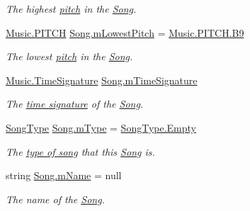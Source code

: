 \begin{DoxyCompactItemize}
\begin{DoxyCompactList}\small\item\em The highest \hyperlink{group___music_enums_ga508f69b199ea518f935486c990edac1d}{pitch} in the \hyperlink{class_song}{Song}. \end{DoxyCompactList}\item 
\hyperlink{group___music_enums_ga508f69b199ea518f935486c990edac1d}{Music.\+P\+I\+T\+CH} \hyperlink{group___song_priv_var_ga293976ef4c2050687a81edfbf77b4fc1}{Song.\+m\+Lowest\+Pitch} = \hyperlink{group___music_enums_gga508f69b199ea518f935486c990edac1da18fc90be5b8124af983421d29bfc4352}{Music.\+P\+I\+T\+C\+H.\+B9}
\begin{DoxyCompactList}\small\item\em The lowest \hyperlink{group___music_enums_ga508f69b199ea518f935486c990edac1d}{pitch} in the \hyperlink{class_song}{Song}. \end{DoxyCompactList}\item 
\hyperlink{group___music_structs_struct_music_1_1_time_signature}{Music.\+Time\+Signature} \hyperlink{group___song_priv_var_ga2b2dcc0e83e49f7303b6a1371877b25e}{Song.\+m\+Time\+Signature}
\begin{DoxyCompactList}\small\item\em The \hyperlink{group___music_structs_struct_music_1_1_time_signature}{time signature} of the \hyperlink{class_song}{Song}. \end{DoxyCompactList}\item 
\hyperlink{group___song_enums_gae681a1f001333e39fc1cb4fea97bfe1b}{Song\+Type} \hyperlink{group___song_priv_var_gaf3b9d0f461522324f897b746311b43c5}{Song.\+m\+Type} = \hyperlink{group___song_enums_ggae681a1f001333e39fc1cb4fea97bfe1bace2c8aed9c2fa0cfbed56cbda4d8bf07}{Song\+Type.\+Empty}
\begin{DoxyCompactList}\small\item\em The \hyperlink{group___song_enums_gae681a1f001333e39fc1cb4fea97bfe1b}{type of song} that this \hyperlink{class_song}{Song} is. \end{DoxyCompactList}\item 
string \hyperlink{group___song_priv_var_ga6a5e6c1e4aa92939e2b5c1e3d9908df8}{Song.\+m\+Name} = null
\begin{DoxyCompactList}\small\item\em The name of the \hyperlink{class_song}{Song}. \end{DoxyCompactList}\end{DoxyCompactItemize}


